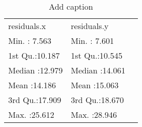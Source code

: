 \begin{table}[htbp]
  \centering
  \caption{Add caption}
    \begin{tabular}{llr}
     residuals.x &  residuals.y &  \\
    Min.   : 7.563   & Min.   : 7.601   &  \\
    1st Qu.:10.187   & 1st Qu.:10.545   &  \\
    Median :12.979   & Median :14.061   &  \\
    Mean   :14.186   & Mean   :15.063   &  \\
    3rd Qu.:17.909   & 3rd Qu.:18.670   &  \\
    Max.   :25.612   & Max.   :28.946   &  \\
    \end{tabular}%
  \label{tab:addlabel}%
\end{table}%
